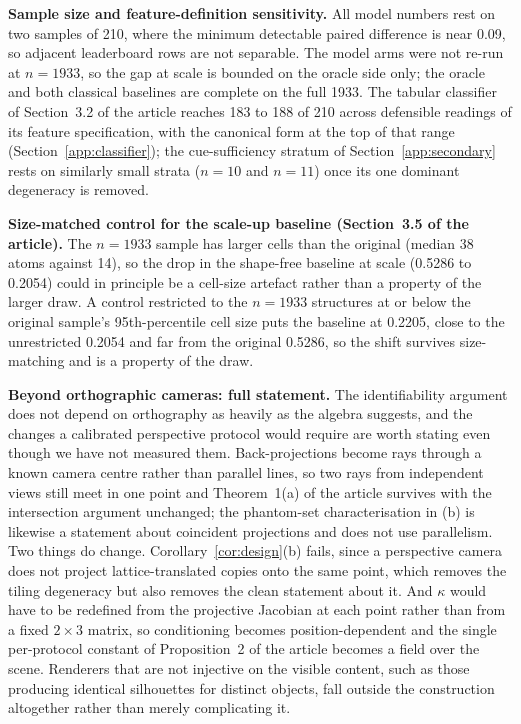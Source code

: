 \textbf{Sample size and feature-definition sensitivity.} All model numbers rest on two samples of 210,
where the minimum detectable paired difference is near 0.09, so adjacent leaderboard rows are not
separable. The model arms were not re-run at $n=1933$, so the gap at scale is bounded on the oracle side
only; the oracle and both classical baselines are complete on the full 1933. The tabular classifier of
Section~3.2 of the article reaches 183 to 188 of 210 across defensible readings of its feature
specification, with the canonical form at the top of that range (Section~\ref{app:classifier}); the
cue-sufficiency stratum of Section~\ref{app:secondary} rests on similarly small strata ($n=10$ and
$n=11$) once its one dominant degeneracy is removed.

\textbf{Size-matched control for the scale-up baseline (Section~3.5 of the article).} The $n=1933$ sample has
larger cells than the original (median 38 atoms against 14), so the drop in the shape-free baseline at scale
(0.5286 to 0.2054) could in principle be a cell-size artefact rather than a property of the larger draw. A
control restricted to the $n=1933$ structures at or below the original sample's 95th-percentile cell size
puts the baseline at 0.2205, close to the unrestricted 0.2054 and far from the original 0.5286, so the shift
survives size-matching and is a property of the draw.

\textbf{Beyond orthographic cameras: full statement.} The identifiability argument does not depend on orthography as heavily
as the algebra suggests, and the changes a calibrated perspective protocol would require are worth stating
even though we have not measured them. Back-projections become rays through a known camera centre rather than
parallel lines, so two rays from independent views still meet in one point and Theorem~1(a) of the article
survives with the intersection argument unchanged; the phantom-set characterisation in (b) is likewise a
statement about coincident projections and does not use parallelism. Two things do change.
Corollary~\ref{cor:design}(b) fails, since a perspective camera does not project lattice-translated copies
onto the same point, which removes the tiling degeneracy but also removes the clean statement about it. And
$\kappa$ would have to be redefined from the projective Jacobian at each point rather than from a fixed
$2\times3$ matrix, so conditioning becomes position-dependent and the single per-protocol constant of
Proposition~2 of the article becomes a field over the scene. Renderers that are not injective on the visible
content, such as those producing identical silhouettes for distinct objects, fall outside the construction
altogether rather than merely complicating it.

